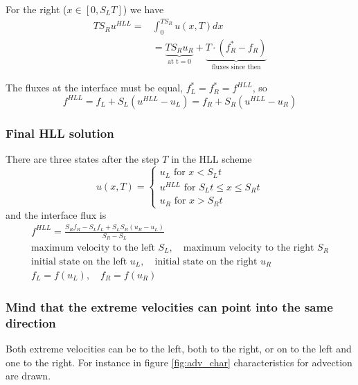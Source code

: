 For the right ($x \in [0, S_L T]$) we have
\begin{equation}
    \begin{aligned}
        T S_R u^{H L L}= & \int_{0}^{T S_R} u(x, T) d x \\
        & = \underbrace{T S_R u_R}_{\text{at t} = 0} + \underbrace{T \cdot\left(f_R^*-f_R\right)}_{\text{fluxes since then}}
    \end{aligned}
\end{equation}

The fluxes at the interface must be equal, $f_L^* = f_R^* = f^{HLL}$, so
\begin{equation}
    f^{H L L}=f_L+S_L\left(u^{H L L}-u_L\right)=f_R+S_R\left(u^{H L L}-u_R\right)
\end{equation}

\subsubsection{Final HLL solution}
There are three states after the step $T$ in the HLL scheme
\begin{equation}
    u(x, T)=\left\{\begin{array}{c}
    u_L \text { for } x<S_L t \\
    u^{H L L} \text { for } S_L t \leq x \leq S_R t \\
    u_R \text { for } x>S_R t
    \end{array}\right.
\end{equation}
and the interface flux is
\begin{equation}
    \begin{gathered}
        f^{H L L}=\frac{S_R f_R-S_L f_L+S_L S_R\left(u_R-u_L\right)}{S_R-S_L} \\
        \text{maximum velocity to the left } S_L, \quad \text{maximum velocity to the right } S_R \\
        \text{initial state on the left } u_L, \quad \text{initial state on the right } u_R \\
        f_L = f(u_L), \quad f_R = f(u_R)
    \end{gathered}
\end{equation}

\subsubsection{Mind that the extreme velocities can point into the same direction}
Both extreme velocities can be to the left, both to the right, or on to the left and one to the right.
For instance in figure \ref{fig:adv_char} characteristics for advection are drawn.

